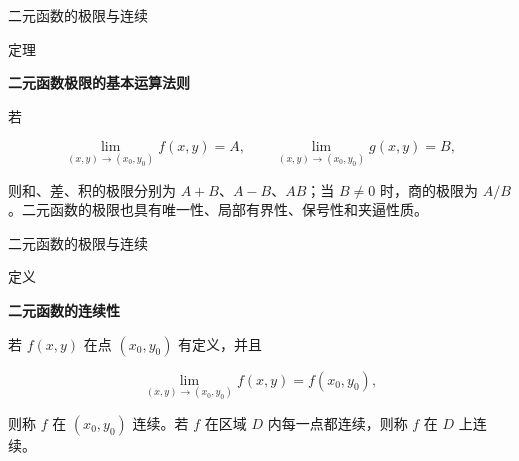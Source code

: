 \documentclass[aspectratio=169,10pt,fontset=fandol]{ctexbeamer}
\newenvironment{warning}{\par\noindent\textbf{注：}\quad}{\par\vspace{0.8em}}
\begin{document}
\begin{frame}[t,fragile]{二元函数的极限与连续}
\normalsize
\begin{block}{定理}
{\normalsize
\textbf{二元函数极限的基本运算法则}\par


	若

	\[

	\lim_{(x,y)\to(x_0,y_0)}f(x,y)=A,\qquad

	\lim_{(x,y)\to(x_0,y_0)}g(x,y)=B,

	\]

	则和、差、积的极限分别为 \(A+B\)、\(A-B\)、\(AB\)；当 \(B\neq0\) 时，商的极限为 \(A/B\)。二元函数的极限也具有唯一性、局部有界性、保号性和夹逼性质。


}
\end{block}
\end{frame}
\begin{frame}[t,fragile]{二元函数的极限与连续}
\normalsize
\begin{block}{定义}
{\normalsize
\textbf{二元函数的连续性}\par


	若 \(f(x,y)\) 在点 \((x_0,y_0)\) 有定义，并且

	\[

	\lim_{(x,y)\to(x_0,y_0)}f(x,y)=f(x_0,y_0),

	\]

	则称 \(f\) 在 \((x_0,y_0)\) 连续。若 \(f\) 在区域 \(D\) 内每一点都连续，则称 \(f\) 在 \(D\) 上连续。


}
\end{block}
\end{frame}
\end{document}

